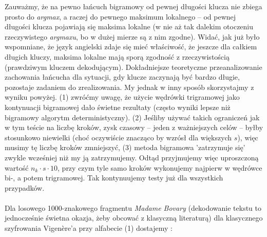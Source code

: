 \documentclass[a4paper]{article}
\theoremstyle{defn}
\theoremstyle{theorem}
\theoremstyle{lemma}
\theoremstyle{cor}
\theoremstyle{fact}
\begin{document}
Zauważmy, że na pewno łańcuch bigramowy od pewnej długości klucza nie zbiega prosto do \textit{argmax}, a raczej do pewnego maksimum lokalnego –  od pewnej długości klucza pojawiają się maksima lokalne (w nie aż tak dalekim otoczeniu rzeczywistego \textit{argmaxu}, bo w dużej mierze są z nim zgodne). Widać, jak już było wspomniane, że język angielski zdaje się mieć właściwość, że jeszcze dla całkiem długich kluczy, maksima lokalne mają sporą zgodność z rzeczywistością (prawdziwym kluczem dekodującym). Dokładniejsze teoretyczne przeanalizowanie zachowania łańcucha dla sytuacji, gdy klucze zaczynają być bardzo długie, pozostaje zadaniem do zrealizowania. My jednak w inny sposób skorzystajmy z wyniku powyżej. (1) zwróćmy uwagę, że użycie wędrówki trigramowej jako kontynuacji bigramowej dało świetne rezultaty (często wyniki lepsze niż bigramowy algorytm deterministyczny). (2) Jeśliby używać takich ograniczeń jak w tym teście na liczbę kroków, zysk czasowy – jeden z ważniejszych celów – byłby stosunkowo niewielki (choć oczywiście znacząco by wzrósł dla większych $s$), więc musimy tę liczbę kroków zmniejszyć, (3) metoda bigramowa 'zatrzymuje się' zwykle wcześniej niż my ją zatrzymujemy. Odtąd przyjmujemy więc uproszczoną wartość $n_k \cdot s \cdot 10$, przy czym tyle samo kroków wykonujemy najpierw w wędrówce bi-, a potem trigramowej. Tak kontynuujemy testy już dla wszystkich przypadków.\\\\
Dla losowego 1000-znakowego fragmentu \textit{Madame Bovary} (dekodowanie tekstu to jednocześnie świetna okazja, żeby obcować z klasyczną literaturą) dla klasycznego szyfrowania Vigenère'a przy alfabecie (1) dostajemy :\\
\end{document}
